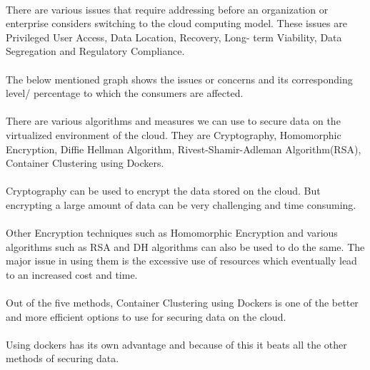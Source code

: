 \paragraph{\hspace{24pt}}
There are various issues that require addressing before an organization or enterprise considers switching to the cloud computing model. These issues are Privileged User Access, Data Location, Recovery, Long- term Viability, Data Segregation and Regulatory Compliance.

\paragraph{\hspace{24pt}}
The below mentioned graph shows the issues or concerns and its corresponding level/ percentage to which the consumers are affected.

\paragraph{\hspace{24pt}}
There are various algorithms and measures we can use to secure data on the virtualized environment of the cloud. They are Cryptography, Homomorphic Encryption, Diffie Hellman Algorithm, Rivest-Shamir-Adleman Algorithm(RSA), Container Clustering using Dockers.

\paragraph{\hspace{24pt}}
Cryptography can be used to encrypt the data stored on the cloud. But encrypting a large amount of data can be very challenging and time consuming.

\paragraph{\hspace{24pt}}
Other Encryption techniques such as Homomorphic Encryption and various algorithms such as RSA and DH algorithms can also be used to do the same. The major issue in using them is the excessive use of resources which eventually lead to an increased cost and time.

\paragraph{\hspace{24pt}}
Out of the five methods, Container Clustering using Dockers is one of the better and more efficient options to use for securing data on the cloud.

\paragraph{\hspace{24pt}}
Using dockers has its own advantage and because of this it beats all the other methods of securing data.